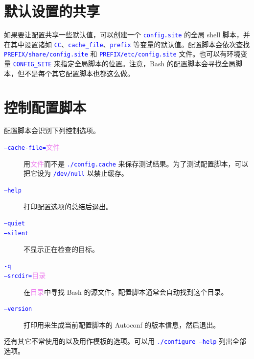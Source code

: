 \documentclass[openany,notitlepage]{book}
\newcommand{\code}[1]{\textcolor{blue}{{\tt #1}}}
\newcommand{\hs}[1]{{\textcolor{violet}{#1}}}
\begin{document}
\begin{CJK}{UTF8}{song}
\section{默认设置的共享} %
如果要让配置共享一些默认值，可以创建一个 \code{config.site} 的全局 shell 脚本，并在其中设置诸如 \code{CC}、\code{cache\_file}、\code{prefix} 等变量的默认值。配置脚本会依次查找 \code{PREFIX/share/config.site} 和 \code{PREFIX/etc/config.site} 文件。也可以有环境变量 \code{CONFIG\_SITE} 来指定全局脚本的位置。注意，Bash 的配置脚本会寻找全局脚本，但不是每个其它配置脚本也都这么做。

\section{控制配置脚本} %
配置脚本会识别下列控制选项。
\begin{description}
    \item[\code{--cache-file=}\hs{文件}] 用\hs{文件}而不是 \code{./config.cache} 来保存测试结果。为了测试配置脚本，可以把它设为 \code{/dev/null} 以禁止缓存。
    \item[\code{--help}] 打印配置选项的总结后退出。
    \item[\code{--quiet}]
    \item[\code{--silent}] 不显示正在检查的目标。
    \item[\code{-q}]
    \item[\code{--srcdir=}\hs{目录}] 在\hs{目录}中寻找 Bash 的源文件。配置脚本通常会自动找到这个目录。
    \item[\code{--version}] 打印用来生成当前配置脚本的 Autoconf 的版本信息，然后退出。
\end{description}
还有其它不常使用的以及用作模板的选项。可以用 \code{./configure --help} 列出全部选项。


\end{CJK}
\end{document}
